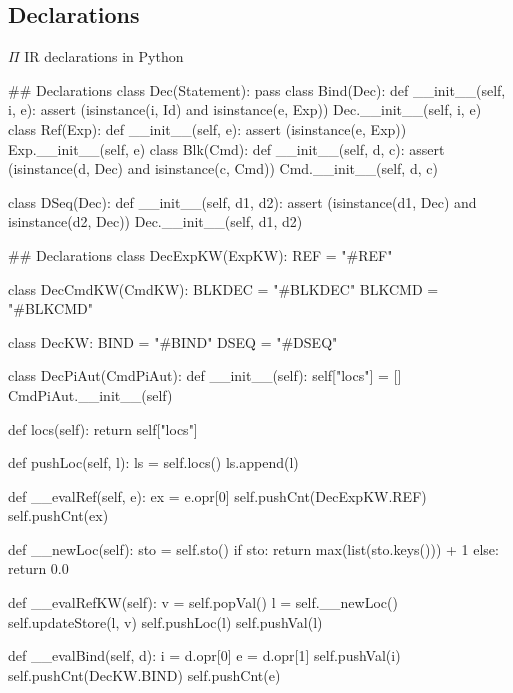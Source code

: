 \documentclass{beamer}
\begin{document}
\subsection{Declarations}
\begin{frame}{{\color{red}$\Pi$ IR} declarations in Python}


\begin{python}
## Declarations
class Dec(Statement): pass
class Bind(Dec):
   def __init__(self, i, e):
       assert (isinstance(i, Id) and isinstance(e, Exp))
       Dec.__init__(self, i, e)
class Ref(Exp):
   def __init__(self, e):
       assert (isinstance(e, Exp))
       Exp.__init__(self, e)
class Blk(Cmd):
   def __init__(self, d, c):
       assert (isinstance(d, Dec) and isinstance(c, Cmd))
       Cmd.__init__(self, d, c)
\end{python}
\framebreak
\begin{python}
class DSeq(Dec):
   def __init__(self, d1, d2):
       assert (isinstance(d1, Dec) and isinstance(d2, Dec))
       Dec.__init__(self, d1, d2)
\end{python}

\framebreak

\begin{python}
## Declarations
class DecExpKW(ExpKW):
   REF = "#REF"

class DecCmdKW(CmdKW):
   BLKDEC = "#BLKDEC"
   BLKCMD = "#BLKCMD"

class DecKW:
   BIND = "#BIND"
   DSEQ = "#DSEQ"

class DecPiAut(CmdPiAut):
   def __init__(self):
       self["locs"] = []
       CmdPiAut.__init__(self)

   def locs(self):
       return self["locs"]

   def pushLoc(self, l):
       ls = self.locs()
       ls.append(l)

   def __evalRef(self, e):
       ex = e.opr[0]
       self.pushCnt(DecExpKW.REF)
       self.pushCnt(ex)

   def __newLoc(self):
       sto = self.sto()
       if sto:
           return max(list(sto.keys())) + 1
       else:
           return 0.0

   def __evalRefKW(self):
       v = self.popVal()
       l = self.__newLoc()
       self.updateStore(l, v)
       self.pushLoc(l)
       self.pushVal(l)

   def __evalBind(self, d):
       i = d.opr[0]
       e = d.opr[1]
       self.pushVal(i)
       self.pushCnt(DecKW.BIND)
       self.pushCnt(e)


\end{python}
\end{frame}
\end{document}
